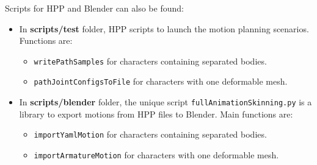 \documentclass[12pt]{article}
\begin{document}
\noindent
Scripts for HPP and Blender can also be found:
\begin{itemize}
	\item In \textbf{scripts/test} folder, HPP scripts to launch the motion planning scenarios. Functions are:
	\begin{itemize}
		\item \texttt{writePathSamples} for characters containing separated bodies.
		\item \texttt{pathJointConfigsToFile} for characters with one deformable mesh.
	\end{itemize}
	\item In \textbf{scripts/blender} folder, the unique script \texttt{fullAnimationSkinning.py} is a library to export motions from HPP files to Blender. Main functions are:
	\begin{itemize}
		\item \texttt{importYamlMotion} for characters containing separated bodies.
		\item \texttt{importArmatureMotion} for characters with one deformable mesh.
	\end{itemize}
\end{itemize}


%
%
\end{document}
